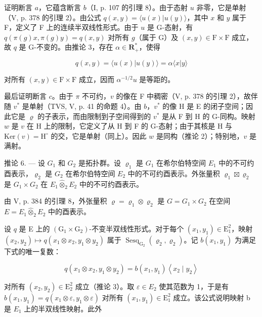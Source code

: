 证明断言 \(a\)，它蕴含断言 \(b\)（I, p. 107 的引理 8）。由于态射 \(u\) 非零，它是单射（V, p. 378 的引理 2）。由公式 \(q(x,y) = \langle u(x)|u(y)\rangle\)，其中 \(x\) 和 \(y\) 属于 F，定义了 F 上的连续半双线性形式。由于 \(u\) 是 G-态射，有 \(q(\pi(g)x,\pi(g)y) = q(x,y)\) 对所有 \(g\)（属于 G）及 \((x,y)\in\mathrm{F}\times\mathrm{F}\) 成立，故 \(q\) 是 G-不变的。由推论 3，存在 \(\alpha\in\mathbf{R}_{+}^{*}\)，使得

\[
q (x, y) = \langle u (x) | u (y) \rangle = \alpha \langle x | y \rangle
\]

对所有 \((x,y)\in\mathrm{F}\times\mathrm{F}\) 成立，因而 \(\alpha^{-1/2}u\) 是等距的。

最后证明断言 \(c\)。由于 \(\pi\) 不可约，\(v\) 的像在 F 中稠密（V, p. 378 的引理 2），故伴随 \(v^*\) 是单射（TVS, V, p. 41 的命题 4）。由 \(b\)，\(v^*\) 的像 H 是 E 的闭子空间；因此它是 \(\varrho\) 的子表示，而由限制到子空间得到的 \(v^*\) 是从 F 到 H 的 G-同构。映射 \(w\) 是 \(v\) 在 H 上的限制，它定义了从 H 到 F 的 G-态射；由于其核是 H 与 \(\text{Ker}(v) = \text{H}^\circ\) 的交，它是单射（同上）。因此 \(w\) 是同构（推论 2）；特别地，\(v\) 是满射。

推论 6. --- 设 \(G_{1}\) 和 \(G_{2}\) 是拓扑群。设 \(\varrho_{1}\) 是 \(G_{1}\) 在希尔伯特空间 \(E_{1}\) 中的不可约酉表示，\(\varrho_{2}\) 是 \(G_{2}\) 在希尔伯特空间 \(E_{2}\) 中的不可约酉表示。外张量积 \(\varrho_{1} \boxtimes \varrho_{2}\) 是 \(G_{1} \times G_{2}\) 在 \(E_{1} \widehat{\otimes}_{2} E_{2}\) 中的不可约酉表示。

由 V, p. 384 的引理 8，外张量积 \(\varrho = \varrho_{1} \otimes \varrho_{2}\) 是 \(G = G_{1} \times G_{2}\) 在空间 \(E = E_{1} \widehat{\otimes}_{2} E_{2}\) 中的酉表示。

设 \(q\) 是 E 上的 \((\mathrm{G}_1 \times \mathrm{G}_2)\)-不变半双线性形式。对于每个 \((x_1, y_1) \in \mathrm{E}_1^2\)，映射 \((x_2, y_2) \mapsto q(x_1 \otimes x_2, y_1 \otimes y_2)\) 属于 \(\operatorname{Sesq}_{\mathrm{G}_2}(\varrho_2, \varrho_2)\)。记 \(b(x_1, y_1)\) 为满足下式的唯一复数：

\[
q (x _ {1} \otimes x _ {2}, y _ {1} \otimes y _ {2}) = b (x _ {1}, y _ {1}) \left\langle x _ {2} \mid y _ {2} \right\rangle
\]

对所有 \((x_{2},y_{2})\in\mathrm{E}_{2}^{2}\) 成立（推论 3）。取 \(\varepsilon\in E_{2}\) 使其范数为 1，于是有 \(b(x_{1},y_{1})=q(x_{1}\otimes\varepsilon,y_{1}\otimes\varepsilon)\) 对所有 \((x_{1},y_{1})\in\mathrm{E}_{1}^{2}\) 成立。该公式说明映射 b 是 \(E_{1}\) 上的半双线性映射。此外

